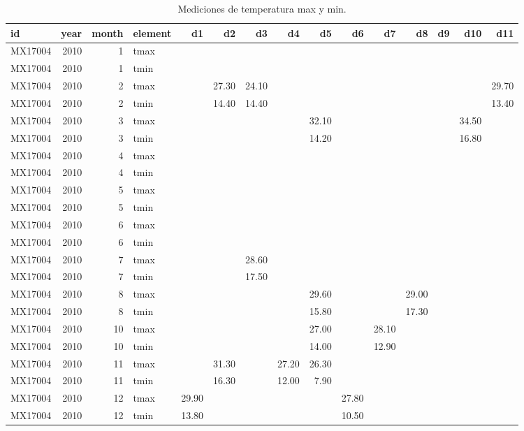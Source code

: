 \documentclass[]{article}
\begin{document}
\begin{table}[ht]
\centering
{\tiny
\begin{tabular}{lrrlrrrrrrrrrrr}
  \hline
id & year & month & element & d1 & d2 & d3 & d4 & d5 & d6 & d7 & d8 & d9 & d10 & d11 \\ 
  \hline
MX17004 & 2010 &   1 & tmax &  &  &  &  &  &  &  &  &  &  &  \\ 
  MX17004 & 2010 &   1 & tmin &  &  &  &  &  &  &  &  &  &  &  \\ 
  MX17004 & 2010 &   2 & tmax &  & 27.30 & 24.10 &  &  &  &  &  &  &  & 29.70 \\ 
  MX17004 & 2010 &   2 & tmin &  & 14.40 & 14.40 &  &  &  &  &  &  &  & 13.40 \\ 
  MX17004 & 2010 &   3 & tmax &  &  &  &  & 32.10 &  &  &  &  & 34.50 &  \\ 
  MX17004 & 2010 &   3 & tmin &  &  &  &  & 14.20 &  &  &  &  & 16.80 &  \\ 
  MX17004 & 2010 &   4 & tmax &  &  &  &  &  &  &  &  &  &  &  \\ 
  MX17004 & 2010 &   4 & tmin &  &  &  &  &  &  &  &  &  &  &  \\ 
  MX17004 & 2010 &   5 & tmax &  &  &  &  &  &  &  &  &  &  &  \\ 
  MX17004 & 2010 &   5 & tmin &  &  &  &  &  &  &  &  &  &  &  \\ 
  MX17004 & 2010 &   6 & tmax &  &  &  &  &  &  &  &  &  &  &  \\ 
  MX17004 & 2010 &   6 & tmin &  &  &  &  &  &  &  &  &  &  &  \\ 
  MX17004 & 2010 &   7 & tmax &  &  & 28.60 &  &  &  &  &  &  &  &  \\ 
  MX17004 & 2010 &   7 & tmin &  &  & 17.50 &  &  &  &  &  &  &  &  \\ 
  MX17004 & 2010 &   8 & tmax &  &  &  &  & 29.60 &  &  & 29.00 &  &  &  \\ 
  MX17004 & 2010 &   8 & tmin &  &  &  &  & 15.80 &  &  & 17.30 &  &  &  \\ 
  MX17004 & 2010 &  10 & tmax &  &  &  &  & 27.00 &  & 28.10 &  &  &  &  \\ 
  MX17004 & 2010 &  10 & tmin &  &  &  &  & 14.00 &  & 12.90 &  &  &  &  \\ 
  MX17004 & 2010 &  11 & tmax &  & 31.30 &  & 27.20 & 26.30 &  &  &  &  &  &  \\ 
  MX17004 & 2010 &  11 & tmin &  & 16.30 &  & 12.00 & 7.90 &  &  &  &  &  &  \\ 
  MX17004 & 2010 &  12 & tmax & 29.90 &  &  &  &  & 27.80 &  &  &  &  &  \\ 
  MX17004 & 2010 &  12 & tmin & 13.80 &  &  &  &  & 10.50 &  &  &  &  &  \\ 
   \hline
\end{tabular}
}
\caption{Mediciones de temperatura max y min.} 
\label{tab:clima}
\end{table}
\end{document}
